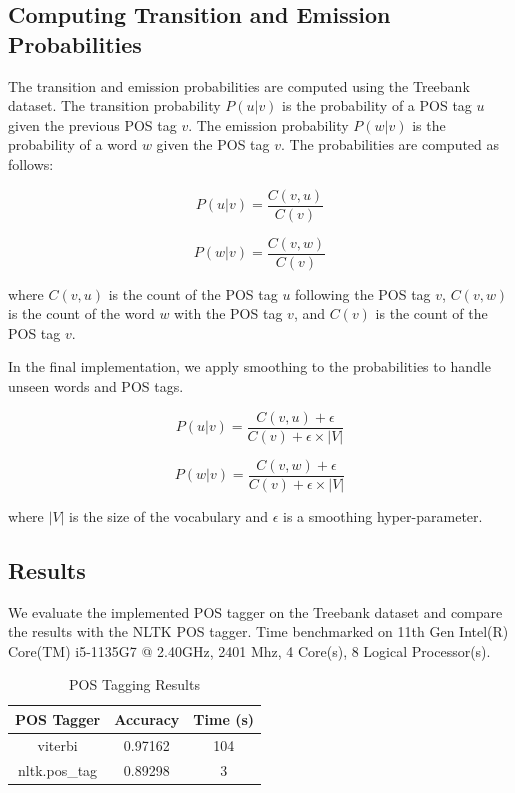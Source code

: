 \documentclass{article}
\begin{document}
\subsection{Computing Transition and Emission Probabilities}

The transition and emission probabilities are computed using the Treebank dataset. The transition probability $P(u|v)$ is the probability of a POS tag $u$ given the previous POS tag $v$. The emission probability $P(w|v)$ is the probability of a word $w$ given the POS tag $v$. The probabilities are computed as follows:

\begin{equation}
    P(u|v) = \frac{C(v, u)}{C(v)}
\end{equation}

\begin{equation}
    P(w|v) = \frac{C(v, w)}{C(v)}
\end{equation}
    
    where $C(v, u)$ is the count of the POS tag $u$ following the POS tag $v$, $C(v, w)$ is the count of the word $w$ with the POS tag $v$, and $C(v)$ is the count of the POS tag $v$.

In the final implementation, we apply smoothing to the probabilities to handle unseen words and POS tags.

\begin{equation}
    P(u|v) = \frac{C(v, u) + \epsilon}{C(v) + \epsilon \times |V|}
\end{equation}

\begin{equation}
    P(w|v) = \frac{C(v, w) + \epsilon}{C(v) + \epsilon \times |V|}
\end{equation}
    
    where $|V|$ is the size of the vocabulary and $\epsilon$ is a smoothing hyper-parameter.

\subsection{Results}
We evaluate the implemented POS tagger on the Treebank dataset and compare the results with the NLTK POS tagger. Time benchmarked on 11th Gen Intel(R) Core(TM) i5-1135G7 @ 2.40GHz, 2401 Mhz, 4 Core(s), 8 Logical Processor(s).

\renewcommand{\arraystretch}{1.5}
\begin{table}[h]
\centering
\begin{tabular}{|c|c|c|}
\hline
\textbf{POS Tagger} & \textbf{Accuracy} & \textbf{Time (s)} \\ \hline
viterbi         & 0.97162              & 104           \\ \hline
nltk.pos\_tag                & 0.89298              & 3            \\ \hline
\end{tabular}
\bigskip
\caption{POS Tagging Results}
\end{table}
\end{document}

